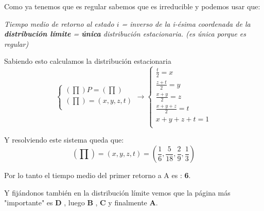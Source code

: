 \begin{problem}[6]
Como ya tenemos que es regular sabemos que es irreducible y podemos usar que:

\textit{Tiempo medio de retorno al estado $i$ = inverso de la i-ésima coordenada de la \textbf{distribución límite} = \textbf{única} distribución estacionaria. (es única porque es regular)}

Sabiendo esto calculamos la distribución estacionaria $$\begin{cases}
(\prod)P = (\prod)\\
(\prod) = (x,y,z,t)\\
\end{cases} \rightarrow \begin{cases}
\frac{t}{2} = x\\
\frac{z+t}{2} = y\\
\frac{x+y}{2} = z\\
\frac{x+y+z}{2} = t\\
x + y + z + t=1\\
\end{cases}$$

Y resolviendo este sistema queda que:
$$(\prod) = (x,y,z,t) = \left(\frac{1}{6}, \frac{5}{18} , \frac{2}{9}, \frac{1}{3}\right)$$

Por lo tanto el tiempo medio del primer retorno a A es : \textbf{6}.

Y fijándonos también en la distribución límite vemos que la página más "importante" es \textbf{D} , luego \textbf{B} , \textbf{C} y finalmente \textbf{A}.




\end{problem}


